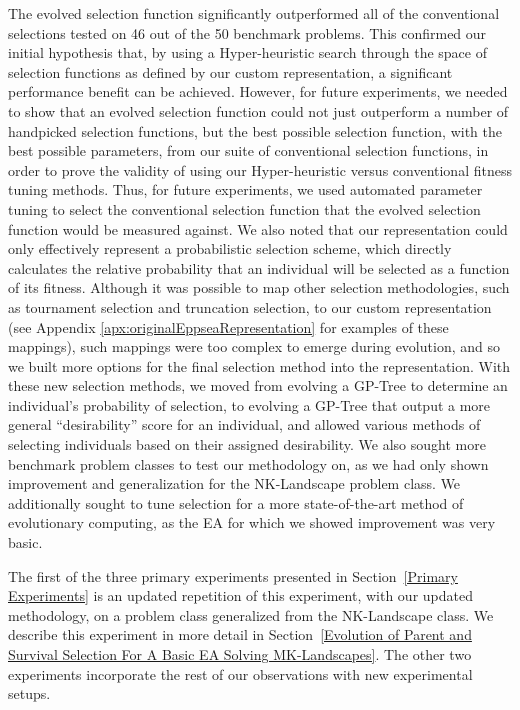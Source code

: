 \documentclass[times,12pt,titlepage]{mstogs}
\begin{document}
\begin{ThesisBody}
The evolved selection function significantly outperformed all of the conventional selections tested on 46 out of the 50 benchmark problems. This confirmed our initial hypothesis that, by using a Hyper-heuristic search through the space of selection functions as defined by our custom representation, a significant performance benefit can be achieved. However, for future experiments, we needed to show that an evolved selection function could not just outperform a number of handpicked selection functions, but the best possible selection function, with the best possible parameters, from our suite of conventional selection functions, in order to prove the validity of using our Hyper-heuristic versus conventional fitness tuning methods. Thus, for future experiments, we used automated parameter tuning to select the conventional selection function that the evolved selection function would be measured against. We also noted that our representation could only effectively represent a probabilistic selection scheme, which directly calculates the relative probability that an individual will be selected as a function of its fitness. Although it was possible to map other selection methodologies, such as tournament selection and truncation selection, to our custom representation (see Appendix \ref{apx:originalEppseaRepresentation} for examples of these mappings), such mappings were too complex to emerge during evolution, and so we built more options for the final selection method into the representation. With these new selection methods, we moved from evolving a GP-Tree to determine an individual's probability of selection, to evolving a GP-Tree that output a more general ``desirability'' score for an individual, and allowed various methods of selecting individuals based on their assigned desirability. We also sought more benchmark problem classes to test our methodology on, as we had only shown improvement and generalization for the NK-Landscape problem class. We additionally sought to tune selection for a more state-of-the-art method of evolutionary computing, as the EA for which we showed improvement was very basic.

The first of the three primary experiments presented in Section~\ref{Primary Experiments} is an updated repetition of this experiment, with our updated methodology, on a problem class generalized from the NK-Landscape class. We describe this experiment in more detail in Section~\ref{Evolution of Parent and Survival Selection For A Basic EA Solving MK-Landscapes}. The other two experiments incorporate the rest of our observations with new experimental setups.


\end{ThesisBody}
\end{document}
